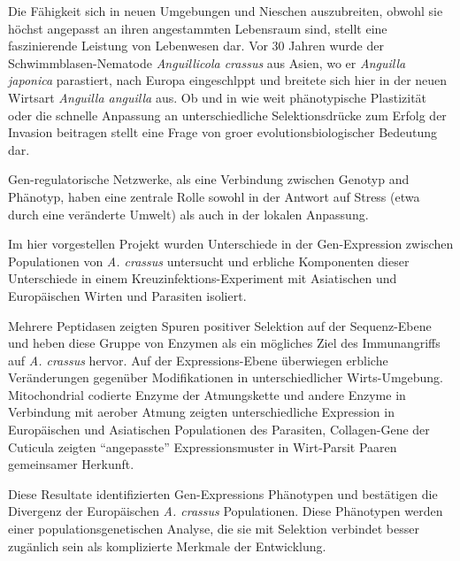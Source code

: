 

\begin{zusammenfassung}        %


  Die F\"ahigkeit sich in neuen Umgebungen und Nieschen auszubreiten,
  obwohl sie h\"ochst angepasst an ihren angestammten Lebensraum sind,
  stellt eine faszinierende Leistung von Lebenwesen dar. Vor 30 Jahren
  wurde der Schwimmblasen-Nematode \textit{Anguillicola crassus} aus
  Asien, wo er \textit{Anguilla japonica} parastiert, nach Europa
  eingeschlppt und breitete sich hier in der neuen Wirtsart
  \textit{Anguilla anguilla} aus. Ob und in wie weit ph\"anotypische
  Plastizit\"at oder die schnelle Anpassung an unterschiedliche
  Selektionsdr\"ucke zum Erfolg der Invasion beitragen stellt eine Frage
  von groer evolutionsbiologischer Bedeutung dar.

  Gen-regulatorische Netzwerke, als eine Verbindung zwischen Genotyp
  and Ph\"anotyp, haben eine zentrale Rolle sowohl in der Antwort auf
  Stress (etwa durch eine ver\"anderte Umwelt) als auch in der lokalen
  Anpassung.

  Im hier vorgestellen Projekt wurden Unterschiede in der
  Gen-Expression zwischen Populationen von \textit{A. crassus}
  untersucht und erbliche Komponenten dieser Unterschiede in einem
  Kreuzinfektions-Experiment mit Asiatischen und Europ\"aischen Wirten
  und Parasiten isoliert.

  Mehrere Peptidasen zeigten Spuren positiver Selektion auf der
  Sequenz-Ebene und heben diese Gruppe von Enzymen als ein m\"ogliches
  Ziel des Immunangriffs auf \textit{A. crassus} hervor. Auf der
  Expressions-Ebene \"uberwiegen erbliche Ver\"anderungen gegen\"uber
  Modifikationen in unterschiedlicher Wirts-Umgebung. Mitochondrial
  codierte Enzyme der Atmungskette und andere Enzyme in Verbindung mit
  aerober Atmung zeigten unterschiedliche Expression in Europ\"aischen
  und Asiatischen Populationen des Parasiten, Collagen-Gene der
  Cuticula zeigten ``angepasste'' Expressionsmuster in Wirt-Parsit
  Paaren gemeinsamer Herkunft.

  Diese Resultate identifizierten Gen-Expressions Ph\"anotypen und
  best\"atigen die Divergenz der Europ\"aischen \textit{A. crassus}
  Populationen. Diese Ph\"anotypen werden einer populationsgenetischen
  Analyse, die sie mit Selektion verbindet besser zug\"anlich sein als
  komplizierte Merkmale der Entwicklung.

\end{zusammenfassung}





